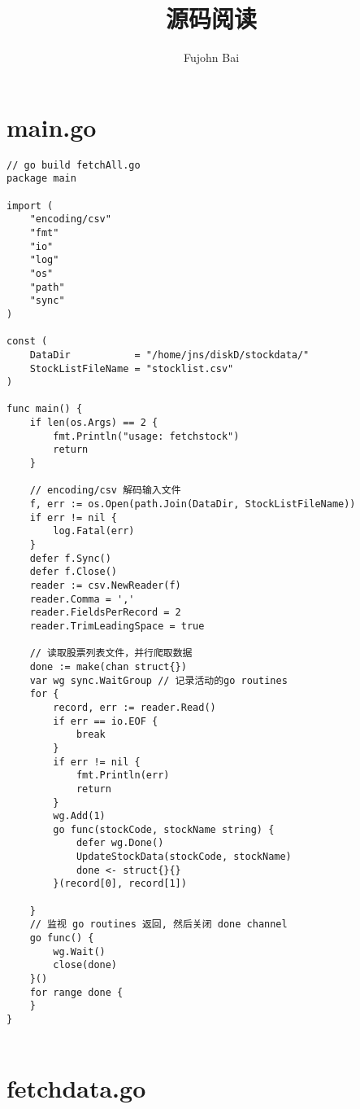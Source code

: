 \documentclass[a5paper,titlepage,landscape,oneside,12pt]{book}
\title{源码阅读}
\author{Fujohn Bai}
\begin{document}
\maketitle

\lstset{
	tabsize=2,
	breaklines=true
}

\chapter{main.go}

\begin{lstlisting}
// go build fetchAll.go
package main

import (
	"encoding/csv"
	"fmt"
	"io"
	"log"
	"os"
	"path"
	"sync"
)

const (
	DataDir           = "/home/jns/diskD/stockdata/"
	StockListFileName = "stocklist.csv"
)

func main() {
	if len(os.Args) == 2 {
		fmt.Println("usage: fetchstock")
		return
	}

	// encoding/csv 解码输入文件
	f, err := os.Open(path.Join(DataDir, StockListFileName))
	if err != nil {
		log.Fatal(err)
	}
	defer f.Sync()
	defer f.Close()
	reader := csv.NewReader(f)
	reader.Comma = ','
	reader.FieldsPerRecord = 2
	reader.TrimLeadingSpace = true

	// 读取股票列表文件，并行爬取数据
	done := make(chan struct{})
	var wg sync.WaitGroup // 记录活动的go routines
	for {
		record, err := reader.Read()
		if err == io.EOF {
			break
		}
		if err != nil {
			fmt.Println(err)
			return
		}
		wg.Add(1)
		go func(stockCode, stockName string) {
			defer wg.Done()
			UpdateStockData(stockCode, stockName)
			done <- struct{}{}
		}(record[0], record[1])

	}
	// 监视 go routines 返回, 然后关闭 done channel
	go func() {
		wg.Wait()
		close(done)
	}()
	for range done {
	}
}


\end{lstlisting}

\chapter{fetchdata.go}
\end{document}
